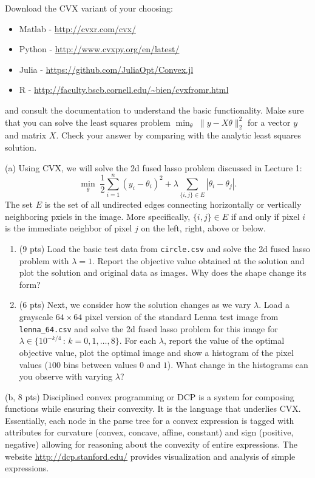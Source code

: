 \documentclass{article}
\theoremstyle{remark}
\theoremstyle{definition}
\begin{document}
Download the CVX variant of your choosing:
\begin{itemize}
\item Matlab - \url{http://cvxr.com/cvx/}
\item Python - \url{http://www.cvxpy.org/en/latest/}
\item Julia - \url{https://github.com/JuliaOpt/Convex.jl}
\item R - \url{http://faculty.bscb.cornell.edu/~bien/cvxfromr.html}
\end{itemize}
and consult the documentation to understand the basic functionality. Make sure
that you can solve the least squares problem $\min_\theta \;
\|y-X\theta\|_2^2$ for a vector $y$ and matrix $X$. Check your answer
by comparing with the analytic least squares solution.

\bigskip
\noindent
(a) Using CVX, we will solve the 2d fused lasso problem discussed in Lecture 1:
$$ \min_\theta \; \frac{1}{2} \sum_{i=1}^n(y_i - \theta_i)^2 +
\lambda \sum_{\{i,j\} \in E}|\theta_i - \theta_{j}|.$$
The set $E$ is the set of all undirected edges connecting horizontally or
vertically neighboring pxiels in the image. More specifically, $\{i,j\} \in E$
if and only if pixel $i$ is the immediate neighbor of pixel $j$ on the left,
right, above or below. 

\begin{enumerate}
    \item (9 pts) Load the basic test data from \texttt{circle.csv} and solve the 2d fused lasso problem
with $\lambda = 1$. Report the objective value obtained at the solution and plot
the solution and original data as images. Why does the shape change its form?

\item (6 pts) Next, we consider how the solution changes as we vary $\lambda$. Load a grayscale $64 \times 64$ pixel version of the
standard Lenna test image from \texttt{lenna\_64.csv} and solve the 2d fused
lasso problem for this image for $\lambda \in \{ 10^{-k/4} \, : \,
k=0, 1, \dots, 8 \}$.  For each $\lambda$, report the value of the
optimal objective value, plot the optimal image and show a histogram of
the pixel values ($100$ bins between values $0$ and $1$). What change in the histograms can you observe with varying $\lambda$?
\end{enumerate}

\bigskip
\noindent
(b, 8 pts) Disciplined convex programming or DCP is a system for composing
functions while ensuring their convexity. It is the language that
underlies CVX.
Essentially, each node in the parse tree for a convex
expression is tagged with attributes for curvature (convex, concave, affine,
constant) and sign (positive, negative) allowing for reasoning about the
convexity of entire expressions. The website \url{http://dcp.stanford.edu/}
provides visualization and analysis of simple expressions.
\end{document}
